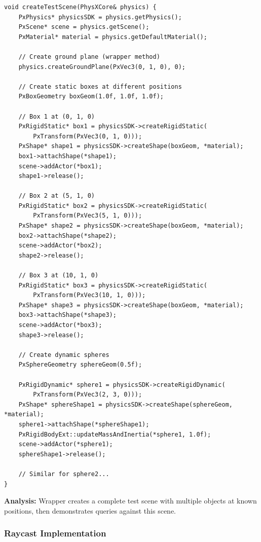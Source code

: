\begin{lstlisting}[style=cpp, caption=Wrapper Scene Setup with Query Objects]
void createTestScene(PhysXCore& physics) {
    PxPhysics* physicsSDK = physics.getPhysics();
    PxScene* scene = physics.getScene();
    PxMaterial* material = physics.getDefaultMaterial();

    // Create ground plane (wrapper method)
    physics.createGroundPlane(PxVec3(0, 1, 0), 0);

    // Create static boxes at different positions
    PxBoxGeometry boxGeom(1.0f, 1.0f, 1.0f);

    // Box 1 at (0, 1, 0)
    PxRigidStatic* box1 = physicsSDK->createRigidStatic(
        PxTransform(PxVec3(0, 1, 0)));
    PxShape* shape1 = physicsSDK->createShape(boxGeom, *material);
    box1->attachShape(*shape1);
    scene->addActor(*box1);
    shape1->release();

    // Box 2 at (5, 1, 0)
    PxRigidStatic* box2 = physicsSDK->createRigidStatic(
        PxTransform(PxVec3(5, 1, 0)));
    PxShape* shape2 = physicsSDK->createShape(boxGeom, *material);
    box2->attachShape(*shape2);
    scene->addActor(*box2);
    shape2->release();

    // Box 3 at (10, 1, 0)
    PxRigidStatic* box3 = physicsSDK->createRigidStatic(
        PxTransform(PxVec3(10, 1, 0)));
    PxShape* shape3 = physicsSDK->createShape(boxGeom, *material);
    box3->attachShape(*shape3);
    scene->addActor(*box3);
    shape3->release();

    // Create dynamic spheres
    PxSphereGeometry sphereGeom(0.5f);

    PxRigidDynamic* sphere1 = physicsSDK->createRigidDynamic(
        PxTransform(PxVec3(2, 3, 0)));
    PxShape* sphereShape1 = physicsSDK->createShape(sphereGeom, *material);
    sphere1->attachShape(*sphereShape1);
    PxRigidBodyExt::updateMassAndInertia(*sphere1, 1.0f);
    scene->addActor(*sphere1);
    sphereShape1->release();

    // Similar for sphere2...
}
\end{lstlisting}

\textbf{Analysis:} Wrapper creates a complete test scene with multiple objects at known positions, then demonstrates queries against this scene.

\subsubsection{Raycast Implementation}

